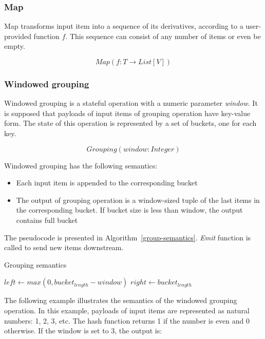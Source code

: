 \subsubsection{Map}
Map transforms input item into a sequence of its derivatives, according to a user-provided function $f$. This sequence can consist of any number of items or even be empty.

\[Map(f: T \rightarrow List[V])\]

\subsubsection{Windowed grouping}
Windowed grouping is a stateful operation with a numeric parameter {\it window}. It is supposed that payloads of input items of grouping operation have key-value form. The state of this operation is represented by a set of buckets, one for each key. 

\[Grouping(window: Integer)\]

Windowed grouping has the following semantics:

\begin{itemize}
    \item Each input item is appended to the corresponding bucket
    \item The output of grouping operation is a window-sized tuple of the last items in the corresponding bucket. If bucket size is less than window, the output contains full bucket
\end{itemize}

The pseudocode is presented in Algorithm~\ref{group-semantics}. {\it Emit} function is called to send new items downstream.

\begin{algorithm}
\caption{Grouping semantics}
\label{group-semantics}
  \begin{algorithmic}[1]
      \State {}
      \State $left \gets max(0, bucket_{length} - window)$
      \State $right \gets bucket_{length}$
      \State {}
    \EndFunction
  \end{algorithmic}
\end{algorithm}

The following example illustrates the semantics of the windowed grouping operation. In this example, payloads of input items are represented as natural numbers: 1, 2, 3, etc. The hash function returns 1 if the number is even and 0 otherwise. If the window is set to 3, the output is:


